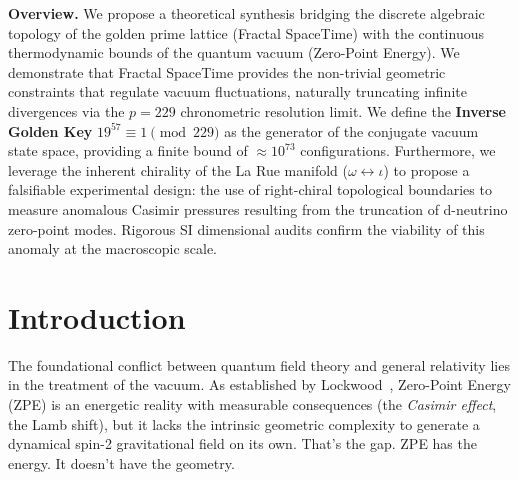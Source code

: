 



\vspace{1em}\noindent\textbf{Overview.}
We propose a theoretical synthesis bridging the discrete algebraic topology of the golden prime lattice (Fractal SpaceTime) with the continuous thermodynamic bounds of the quantum vacuum (Zero-Point Energy). We demonstrate that Fractal SpaceTime provides the non-trivial geometric constraints that regulate vacuum fluctuations, naturally truncating infinite divergences via the $p=229$ chronometric resolution limit. We define the \textbf{Inverse Golden Key} $19^{57} \equiv 1 \pmod{229}$ as the generator of the conjugate vacuum state space, providing a finite bound of $\approx 10^{73}$ configurations. Furthermore, we leverage the inherent chirality of the La Rue manifold ($\omega \leftrightarrow \iota$) to propose a falsifiable experimental design: the use of right-chiral topological boundaries to measure anomalous Casimir pressures resulting from the truncation of d-neutrino zero-point modes. Rigorous SI dimensional audits confirm the viability of this anomaly at the macroscopic scale.
\vspace{1em}

\section{Introduction}\label{sec:intro}

The foundational conflict between quantum field theory and general relativity lies in the treatment of the vacuum. As established by Lockwood~\cite{lockwood2025zpe}, Zero-Point Energy (ZPE) is an energetic reality with measurable consequences (the \emph{Casimir effect}, the Lamb shift), but it lacks the intrinsic geometric complexity to generate a dynamical spin-2 gravitational field on its own. That's the gap. ZPE has the energy. It doesn't have the geometry.


